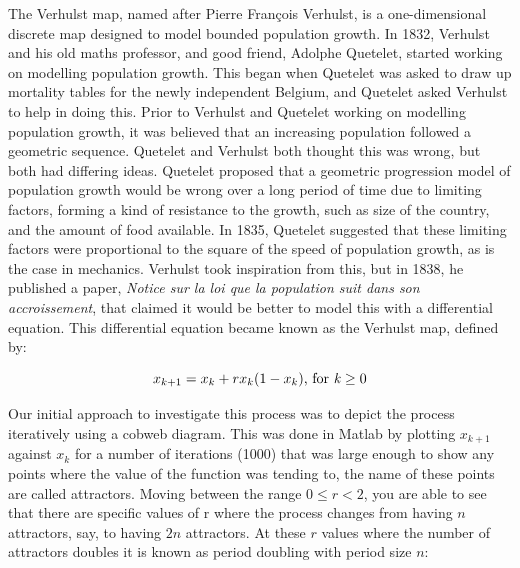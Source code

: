 \documentclass[a4wide, 10pt]{article}
\begin{document}
The Verhulst map, named after Pierre François Verhulst, is a one-dimensional
 discrete map designed to model bounded population growth. In 1832, Verhulst and his
  old maths professor, and good friend, Adolphe Quetelet, started working on
   modelling population growth\cite{Pierre Verhulst Biography}. This began when Quetelet
    was asked to draw up mortality tables for the newly independent Belgium, and Quetelet
     asked Verhulst to help in doing this. Prior to Verhulst and Quetelet working on
      modelling population growth, it was believed that an increasing population followed a
       geometric sequence. Quetelet and Verhulst both thought this was wrong, but
        both had differing ideas. Quetelet proposed that a geometric progression
         model of population growth would be wrong over a long period of time due to
          limiting factors, forming a kind of resistance to the growth, such as size
           of the country, and the amount of food available. In 1835, Quetelet
            suggested that these limiting factors were proportional to the square of
             the speed of population growth, as is the case in mechanics\cite{Information 
              on Veruhlst and Verhulst/Logistic Maps}.
               Verhulst took inspiration from this, but in 1838, he published a paper, 
                \emph{Notice sur la loi que la population suit dans son accroissement}, 
                 that claimed it would be better to model this with a differential
                  equation\cite{Pierre Verhulst Biography}. This differential equation
                   became known as the Verhulst map, defined by: 

\[
  x_{k+1} = x_{k} + rx_{k}(1 - x_{k}) \textrm{, for \emph{k}} \geq 0
\]

Our initial approach to investigate this process was to depict the process iteratively 
 using a cobweb diagram. This was done in Matlab by plotting $x_{k+1}$ against
  $x_{k}$ for a number of iterations (1000) that was large enough to show any points where 
   the value of the function was tending to, the name of these points are called attractors.
    Moving between the range $ 0 \leq r < 2 $, you are able to see that there are specific
     values of r where the process changes from having $n$ attractors, say, to having $2n$
      attractors. At these $r$ values where the number of attractors doubles it is known as
       period doubling with period size $n$: 
\end{document}
